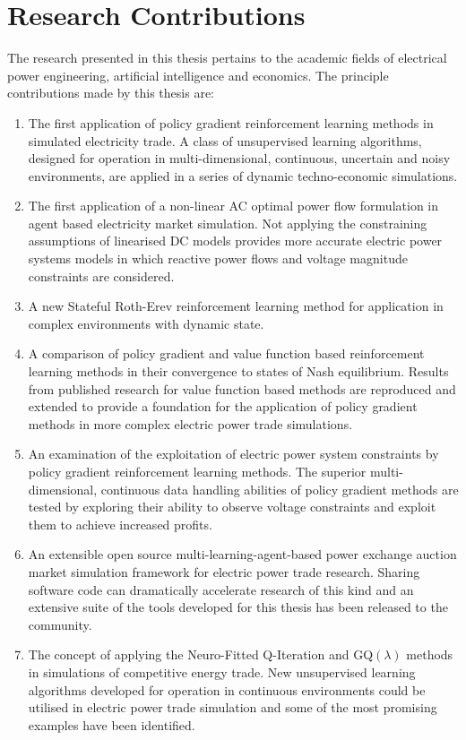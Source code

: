\section{Research Contributions}
The research presented in this thesis pertains to the academic fields of
electrical power engineering, artificial intelligence and economics.  The
principle contributions made by this thesis are:
\begin{enumerate}
  \item The first application of policy gradient reinforcement learning
  methods in simulated electricity trade.  A class of unsupervised learning
  algorithms, designed for operation in multi-dimensional, continuous,
  uncertain and noisy environments, are applied in a series of dynamic
  techno-economic simulations.
  \item The first application of a non-linear AC optimal power flow formulation
  in agent based electricity market simulation.  Not applying the constraining
  assumptions of linearised DC models provides more accurate electric power
  systems models in which reactive power flows and voltage magnitude constraints
  are considered.
  \item A new Stateful Roth-Erev reinforcement learning method for application
  in complex environments with dynamic state.
  \item A comparison of policy gradient and value function based reinforcement
  learning methods in their convergence to states of Nash equilibrium. Results
  from published research for value function based methods are reproduced and
  extended to provide a foundation for the application of policy gradient
  methods in more complex electric power trade simulations.
  \item An examination of the exploitation of electric power system constraints
  by policy gradient reinforcement learning methods.  The
  superior multi-dimensional, continuous data handling abilities of policy
  gradient methods are tested by exploring their ability to observe voltage
  constraints and exploit them to achieve increased profits.
  \item An extensible open source multi-learning-agent-based
  power exchange auction market simulation framework for electric power trade
  research. Sharing software code can dramatically accelerate research of this
  kind and an extensive suite of the tools developed for this thesis has been released
  to the community.
  \item The concept of applying the Neuro-Fitted Q-Iteration and GQ$(\lambda)$
  methods in simulations of competitive energy trade. New unsupervised learning
  algorithms developed for operation in continuous environments could be utilised in
  electric power trade simulation and some of the most promising examples have
  been identified.
\end{enumerate}
